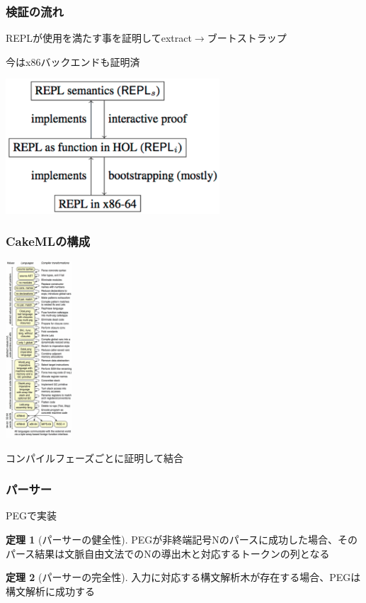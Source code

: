 \documentclass[dvipdfmx,cjk,xcolor=dvipsnames,envcountsect,notheorems,12pt]{beamer}
\theoremstyle{definition}
\newtheorem{theorem}{定理}
\begin{document}
\begin{frame}
	\frametitle{検証の流れ}
	\Large
	REPLが使用を満たす事を証明してextract$\rightarrow$ブートストラップ

	今はx86バックエンドも証明済

	\begin{center}
		\includegraphics[width=80mm]{./verification.png}
	\end{center}
\end{frame}

\begin{frame}
	\frametitle{CakeMLの構成}
	\Large
	\begin{center}
		\includegraphics[width=25mm]{./phase.png}
	\end{center}
	コンパイルフェーズごとに証明して結合
\end{frame}

\begin{frame}
	\frametitle{パーサー}
	{\Large PEGで実装}
  \begin{theorem}[パーサーの健全性]
		PEGが非終端記号Nのパースに成功した場合、そのパース結果は文脈自由文法でのNの導出木と対応するトークンの列となる
  \end{theorem}
  \begin{theorem}[パーサーの完全性]
		入力に対応する構文解析木が存在する場合、PEGは構文解析に成功する
  \end{theorem}
\end{frame}
\end{document}
